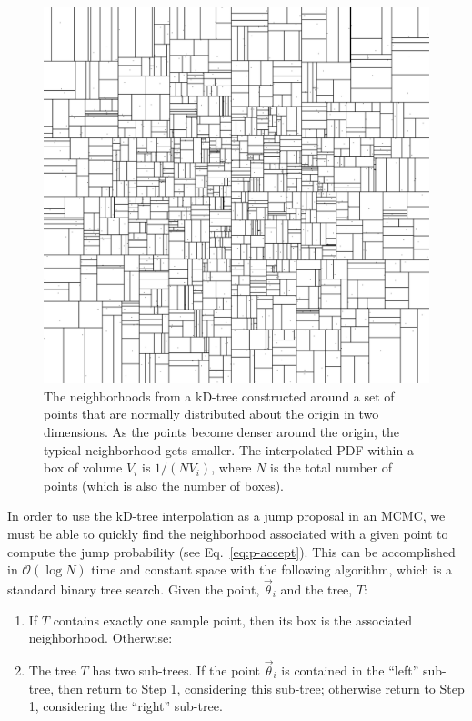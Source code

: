 \documentclass{iopart}
\newcommand{\vtheta}{\vec{\theta}}
\newcommand{\order}[1]{\mathcal{O}\left( #1 \right)}
\begin{document}
\begin{figure}
  \begin{center}
    \includegraphics[width=0.8\columnwidth]{Figure1_kdtree}
  \end{center}
  \caption{\label{fig:kD-tree} The neighborhoods from a kD-tree
    constructed around a set of points that are normally distributed
    about the origin in two dimensions.  As the points become denser
    around the origin, the typical neighborhood gets smaller.  The
    interpolated PDF within a box of volume $V_i$ is $1/(N V_i)$,
    where $N$ is the total number of points (which is also the number
    of boxes).}
\end{figure}

In order to use the kD-tree interpolation as a jump proposal in an
MCMC, we must be able to quickly find the neighborhood associated with
a given point to compute the jump probability (see
Eq.~\ref{eq:p-accept}).  This can be accomplished in $\order{\log N}$
time and constant space with the following algorithm, which is a
standard binary tree search.  Given the point, $\vtheta_i$ and the
tree, $T$:
\begin{enumerate}
\item If $T$ contains exactly one sample point, then its box is the
  associated neighborhood.  Otherwise:
\item The tree $T$ has two sub-trees.  If the point $\vtheta_i$ is
  contained in the ``left'' sub-tree, then return to Step 1,
  considering this sub-tree; otherwise return to Step 1, considering
  the ``right'' sub-tree.
\end{enumerate}
\end{document}

